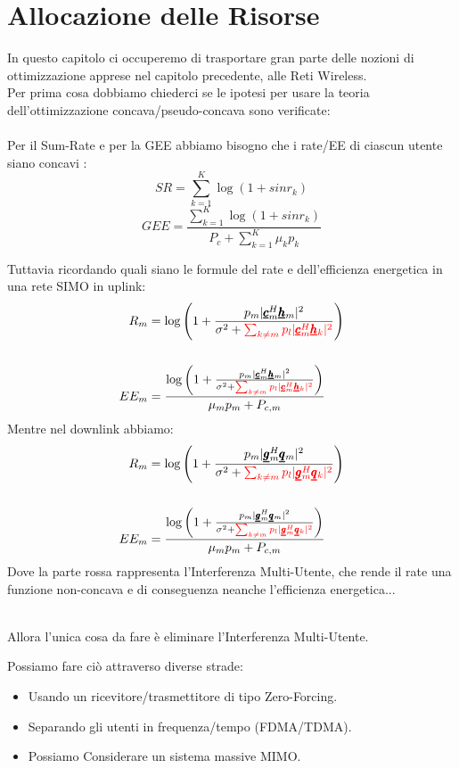 \chapter{Allocazione delle Risorse}
In questo capitolo ci occuperemo di trasportare gran parte delle nozioni di ottimizzazione  apprese nel capitolo precedente, alle Reti Wireless.
\\
Per prima cosa dobbiamo chiederci se le ipotesi per usare la teoria dell'ottimizzazione concava/pseudo-concava sono verificate:
\\ \\
Per il Sum-Rate e per la GEE abbiamo bisogno che i rate/EE di ciascun utente siano concavi :
    \begin{equation*}
        SR = \sum_{k=1}^K \log(1 + sinr_k) 
    \end{equation*}
    \begin{equation*}
         GEE = \frac{\sum_{k=1}^K \log(1 + sinr_k)}{P_c + \sum_{k=1}^K \mu_k p_k}
    \end{equation*}


Tuttavia ricordando quali siano le formule del rate e dell'efficienza energetica in una rete SIMO in uplink:
\begin{equation*}
    \begin{aligned}
    R_m &= \log\left(1 + \frac{p_m |\pmb{\underline{c}}_m^H \pmb{\underline{h}}_m |^2}{\sigma^2 + \color{red} \sum_{k\neq m} p_l |\pmb{\underline{c}}_m^H \pmb{\underline{h}}_k |^2} \right) \\ \\
        EE_m &= \frac{\log\left(1 + \frac{p_m |\pmb{\underline{c}}_m^H \pmb{\underline{h}}_m |^2}{\sigma^2 + \color{red} \sum_{k\neq m} p_l |\pmb{\underline{c}}_m^H \pmb{\underline{h}}_k |^2} \right)}{\mu_m p_m + P_{c,m}}
    \end{aligned}
\end{equation*}
Mentre nel downlink abbiamo:
\begin{equation*}
    \begin{aligned}
    R_m &= \log\left(1 + \frac{p_m |\pmb{\underline{g}}_m^H \pmb{\underline{q}}_m |^2}{\sigma^2 + \color{red} \sum_{k\neq m} p_l |\pmb{\underline{g}}_m^H \pmb{\underline{q}}_k |^2} \right) \\ \\
        EE_m &= \frac{\log\left(1 + \frac{p_m |\pmb{\underline{g}}_m^H \pmb{\underline{q}}_m |^2}{\sigma^2 + \color{red} \sum_{k\neq m} p_l |\pmb{\underline{g}}_m^H \pmb{\underline{q}}_k |^2} \right)}{\mu_m p_m + P_{c,m}}
    \end{aligned}
\end{equation*}
Dove la parte rossa rappresenta l'Interferenza Multi-Utente, che rende il rate una funzione non-concava e di conseguenza neanche l'efficienza energetica...\\ \\
\begin{center}
    Allora l'unica cosa da fare è eliminare l'Interferenza Multi-Utente.
\end{center}
Possiamo fare ciò attraverso diverse strade:
\begin{itemize}
    \item Usando un ricevitore/trasmettitore di tipo Zero-Forcing.
    \item Separando gli utenti in frequenza/tempo (FDMA/TDMA).
    \item Possiamo Considerare un sistema massive MIMO.
\end{itemize}
